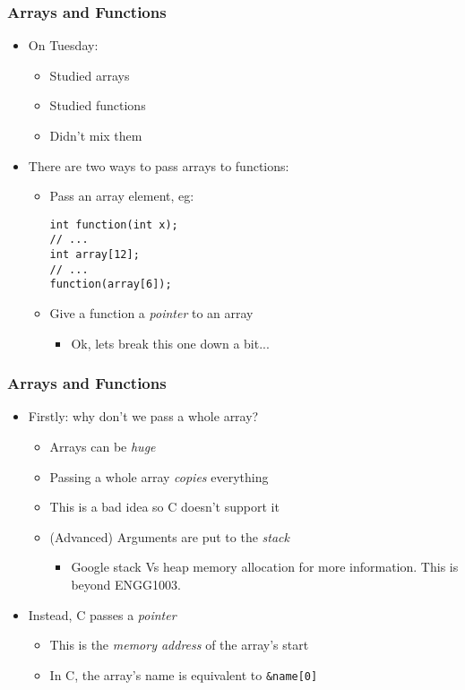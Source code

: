 \documentclass[14pt]{beamer}
\begin{document}
\begin{frame}[fragile]
\frametitle{Arrays and Functions}
\begin{itemize}
\item On Tuesday:
	\begin{itemize}
		\item Studied arrays
		\item Studied functions
		\item Didn't mix them
	\end{itemize}
\pause
\item There are two ways to pass arrays to functions:
\vspace{-5mm}
	\begin{itemize}
	\pause
		\item Pass an array element, eg:
		\begin{lstlisting}[style=CStyle]
int function(int x);
// ...
int array[12];
// ...
function(array[6]);
\end{lstlisting}
\pause
		\item Give a function a \textit{pointer} to an array
			\begin{itemize}
				\item Ok, lets break this one down a bit...
			\end{itemize}
	\end{itemize}
\end{itemize}
\end{frame}

\begin{frame}
\frametitle{Arrays and Functions}
\begin{itemize}
\item Firstly: why don't we pass a whole array?
\pause
	\begin{itemize}
		\item Arrays can be \textit{huge}
		\item Passing a whole array \textit{copies} everything
		\item This is a bad idea so C doesn't support it
		\item (Advanced) Arguments are put to the \textit{stack}
			\begin{itemize}
				\item Google stack Vs heap memory allocation for more information. This is beyond ENGG1003.
			\end{itemize}
	\end{itemize}
\pause
\item Instead, C passes a \textit{pointer}
	\begin{itemize}
		\item This is the \textit{memory address} of the array's start
		\pause
		\item In C, the array's name is equivalent to \texttt{\&name[0]}
	\end{itemize}
\end{itemize}
\end{frame}
\end{document}
